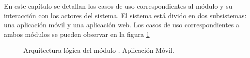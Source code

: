 En este capítulo se detallan los casos de uso correspondientes al módulo \varModulo y su interacción con los actores del sistema. El sistema está divido en dos subsistemas: una aplicación móvil y una aplicación web. Los casos de uso correspondientes a ambos módulos se pueden observar en la figura \ref{fig:arqLogica}
\begin{figure}[hbtp!]
	\begin{center}
		\caption{Arquitectura lógica del módulo \varModulo. Aplicación Móvil.}
		\label{fig:arqLogica}
	\end{center}
\end{figure}